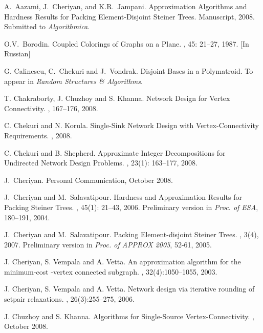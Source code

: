 \documentclass[11pt]{article}
\begin{document}
\begin{thebibliography}{55}
A.~Aazami, J.~Cheriyan, and K.R.~Jampani.
\newblock Approximation Algorithms and Hardness Results for Packing
Element-Disjoint Steiner Trees.
\newblock Manuscript, 2008. Submitted to {\em Algorithmica}.

O.V.~Borodin. 
\newblock Coupled Colorings of Graphs on a Plane.
, 45: 21--27, 1987. [In Russian]

G. Calinescu, C.~Chekuri and J.~Vondrak.
\newblock Disjoint Bases in a Polymatroid.
\newblock To appear in {\em Random Structures \& Algorithms}.

T. Chakraborty, J. Chuzhoy and S. Khanna.
\newblock Network Design for Vertex Connectivity.
, 167--176, 2008. 

C. Chekuri and N. Korula.
\newblock Single-Sink Network Design with Vertex-Connectivity
Requirements.
, 2008.

C. Chekuri and B. Shepherd.
\newblock Approximate Integer Decompositions for Undirected Network
Design Problems. 
, 23(1): 163--177, 2008.

J.~Cheriyan.
\newblock Personal Communication, October 2008.

J.~Cheriyan and M.~Salavatipour.
\newblock Hardness and Approximation Results for Packing Steiner Trees.
, 45(1): 21--43, 2006.
\newblock Preliminary version in {\em Proc. of ESA}, 180--191, 2004.

J.~Cheriyan and M.~Salavatipour.
\newblock Packing Element-disjoint Steiner Trees.
, 3(4), 2007.
\newblock Preliminary version in {\em Proc. of APPROX 2005}, 52-61, 2005.

J. Cheriyan, S. Vempala and A. Vetta.
\newblock An approximation algorithm for the minimum-cost -vertex connected
subgraph.
, 32(4):1050--1055, 2003.

J. Cheriyan, S. Vempala and A. Vetta.
\newblock Network design via iterative rounding of setpair relaxations.
, 26(3):255--275, 2006.

J. Chuzhoy and S. Khanna.
\newblock Algorithms for Single-Source Vertex-Connectivity.
,  October 2008.


\end{thebibliography}
\end{document}
